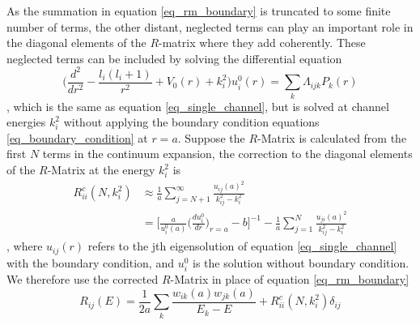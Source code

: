 As the summation in equation \ref{eq_rm_boundary} is truncated to some finite number of terms, the other distant, neglected terms can play an important role in the diagonal elements of the $R$-matrix where they add coherently. These neglected terms can be included by solving the differential equation
\begin{equation}
\Bigg(\frac{d^2}{dr^2} - \frac{l_i(l_i+1)}{r^2} + V_0(r) + k_{i}^2\Bigg) u_{i}^0(r) = \sum_{k} \Lambda_{ijk} P_k(r)
\end{equation}
, which is the same as equation \ref{eq_single_channel}, but is solved at channel energies $k_i^2$ without applying the boundary condition equations \ref{eq_boundary_condition} at $r=a$. Suppose the $R$-Matrix is calculated from the first $N$ terms in the continuum expansion, the correction to the diagonal elements of the $R$-Matrix at the energy $k_i^2$ is 
\begin{equation}
	\begin{split}
		R_{ii}^c (N, k_i^2) &\approx \frac{1}{a} \sum_{j=N+1}^{\infty} \frac{u_{ij}(a)^2}{k_{ij}^2-k_i^2} \\
		& = \Bigg[ \frac{a}{u_i^0(a)} \Bigg( \frac{du_i^0}{dr} \Bigg)_{r=a} -b \Bigg]^{-1} - \frac{1}{a} \sum_{j=1}^{N} \frac{u_{ji}(a)^2}{k_{ij}^2 - k_i^2}
	\end{split}
\end{equation}
, where $u_{ij}(r)$ refers to the jth eigensolution of equation \ref{eq_single_channel} with the boundary condition, and $u_i^0$ is the solution without boundary condition. We therefore use the corrected $R$-Matrix in place of equation \ref{eq_rm_boundary}
\begin{equation}
R_{ij}(E) = \frac{1}{2a} \sum_k \frac{w_{ik}(a)w_{jk}(a)}{E_k - E} +R_{ii}^c(N, k_i^2)\delta_{ij}
\end{equation}

